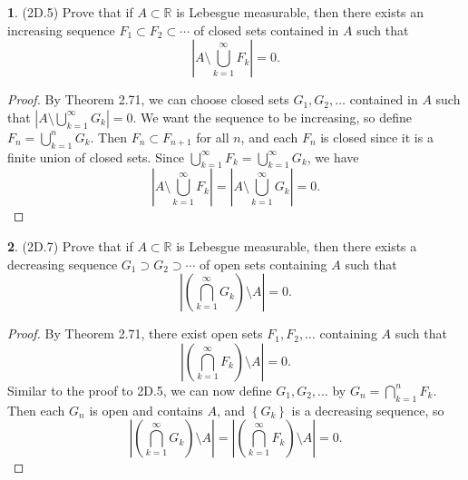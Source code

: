 \documentclass[12pt]{article}
\theoremstyle{definition}
\newtheorem{ex}{}
\begin{document}
\begin{ex}
	(2D.5)
	Prove that if $A \subset \mathbb{R}$ is Lebesgue measurable, then there exists an increasing sequence $F_1 \subset F_2 \subset \cdots$ of closed sets contained in $A$ such that \begin{equation*}
		\left| A \setminus \bigcup_{k=1}^\infty F_k \right| = 0.
	\end{equation*}
\end{ex}
\begin{proof}
	By Theorem 2.71, we can choose closed sets $G_1, G_2, \dots$ contained in $A$ such that $\left| A \setminus \bigcup_{k=1}^\infty G_k \right| = 0$.
	We want the sequence to be increasing, so define $F_n = \bigcup_{k=1}^n G_k$.
	Then $F_n \subset F_{n+1}$ for all $n$, and each $F_n$ is closed since it is a finite union of closed sets.
	Since $\bigcup_{k=1}^\infty F_k = \bigcup_{k=1}^\infty G_k$, we have \begin{equation*}
		\left| A \setminus \bigcup_{k=1}^\infty F_k \right| = \left| A \setminus \bigcup_{k=1}^\infty G_k \right| = 0.
	\end{equation*}
\end{proof}

\begin{ex}
	(2D.7)
	Prove that if $A \subset \mathbb{R}$ is Lebesgue measurable, then there exists a decreasing sequence $G_1 \supset G_2 \supset \cdots$ of open sets containing $A$ such that \begin{equation*}
		\left| \left( \bigcap_{k=1}^\infty G_k \right) \setminus A \right| = 0.
	\end{equation*}
\end{ex}
\begin{proof}
	By Theorem 2.71, there exist open sets $F_1, F_2, \dots$ containing $A$ such that \begin{equation*}
		\left| \left( \bigcap_{k=1}^\infty F_k \right) \setminus A \right| = 0.
	\end{equation*}
	Similar to the proof to 2D.5, we can now define $G_1, G_2, \dots$ by $G_n = \bigcap_{k=1}^n F_k$.
	Then each $G_n$ is open and contains $A$, and $\left\lbrace G_k \right\rbrace$ is a decreasing sequence, so \begin{equation*}
		\left| \left( \bigcap_{k=1}^\infty G_k \right) \setminus A \right| = \left| \left( \bigcap_{k=1}^\infty F_k \right) \setminus A \right| = 0.
	\end{equation*}
\end{proof}
\end{document}
